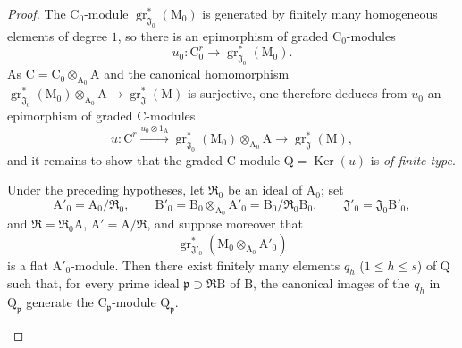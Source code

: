 \begin{proof}
The $\mathrm{C}_0$-module $\operatorname{gr}^*_{\mathfrak{J}_0}(\mathrm{M}_0)$ is generated by finitely many homogeneous elements of degree $1$, so there is an epimorphism of graded $\mathrm{C}_0$-modules
\[
  u_0:\mathrm{C}_0^r\longrightarrow\operatorname{gr}^*_{\mathfrak{J}_0}(\mathrm{M}_0).
\]
As $\mathrm{C}=\mathrm{C}_0\otimes_{\mathrm{A}_0}\mathrm{A}$ and the canonical homomorphism $\operatorname{gr}^*_{\mathfrak{J}_0}(\mathrm{M}_0)\otimes_{\mathrm{A}_0}\mathrm{A}\to\operatorname{gr}^*_\mathfrak{J}(\mathrm{M})$ is surjective, one therefore deduces from $u_0$ an epimorphism of graded $\mathrm{C}$-modules
\[
  u:\mathrm{C}^r\xrightarrow{u_0\otimes 1_{\mathrm{A}}}\operatorname{gr}^*_{\mathfrak{J}_0}(\mathrm{M}_0)\otimes_{\mathrm{A}_0}\mathrm{A}\longrightarrow\operatorname{gr}^*_\mathfrak{J}(\mathrm{M}),
\]
and it remains to show that the graded $\mathrm{C}$-module
$\mathrm{Q}=\operatorname{Ker}(u)$ is \emph{of finite type}.
\\[0.4\baselineskip]
\begin{lemma}[11.2.9.6]
\label{IV.11.2.9.6}
Under the preceding hypotheses, let $\mathfrak{R}_0$ be an ideal of $\mathrm{A}_0$; set
\[
  \mathrm{A}'_0=\mathrm{A}_0/\mathfrak{R}_0,\qquad
  \mathrm{B}'_0=\mathrm{B}_0\otimes_{\mathrm{A}_0}\mathrm{A}'_0
  =\mathrm{B}_0/\mathfrak{R}_0\mathrm{B}_0,\qquad
  \mathfrak{J}'_0=\mathfrak{J}_0\mathrm{B}'_0,
\]
and $\mathfrak{R}=\mathfrak{R}_0\mathrm{A}$, $\mathrm{A}'=\mathrm{A}/\mathfrak{R}$, and suppose moreover that
\[
  \operatorname{gr}^*_{\mathfrak{J}'_0}
  (\mathrm{M}_0\otimes_{\mathrm{A}_0}\mathrm{A}'_0)
\]
is a flat $\mathrm{A}'_0$-module. Then there exist finitely many elements $q_h$ ($1\leqslant h\leqslant s$) of $\mathrm{Q}$ such that, for every prime ideal $\mathfrak{p}\supset\mathfrak{R}\mathrm{B}$ of $\mathrm{B}$, the canonical images of the $q_h$ in $\mathrm{Q}_\mathfrak{p}$ generate the $\mathrm{C}_\mathfrak{p}$-module $\mathrm{Q}_\mathfrak{p}$.
\end{lemma}


\end{proof}
